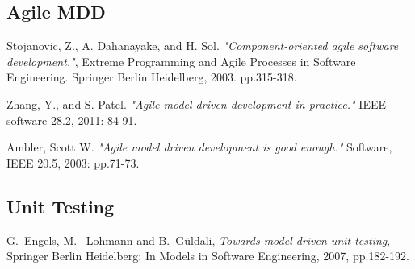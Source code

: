 \documentclass[ProjectPlan_innit.tex]{subfiles}
\begin{document}
\begin{thebibliography}{1}
\subsection{Agile MDD}
\bibitem{}
Stojanovic, Z., A. Dahanayake, and H. Sol. \emph{"Component-oriented agile software development."}, Extreme Programming and Agile Processes in Software Engineering. Springer Berlin Heidelberg, 2003. pp.315-318.

\bibitem{}
Zhang, Y., and S. Patel. \emph{"Agile model-driven development in practice."} IEEE software 28.2, 2011: 84-91.

\bibitem{}
Ambler, Scott W. \emph{"Agile model driven development is good enough."} Software, IEEE 20.5, 2003: pp.71-73.



\subsection{Unit Testing}
\bibitem{} 
G.~Engels, M. ~Lohmann and B.~Güldali, \emph{Towards model-driven unit testing}, Springer Berlin Heidelberg: In Models in Software Engineering, 2007, pp.182-192.


\end{thebibliography}
\end{document}
